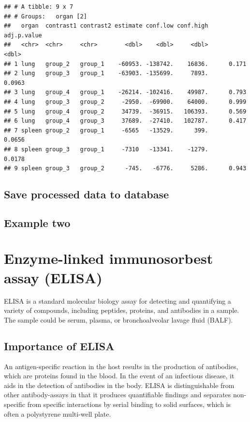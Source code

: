 \documentclass[
]{book}
\begin{document}
\begin{verbatim}
## # A tibble: 9 x 7
## # Groups:   organ [2]
##   organ  contrast1 contrast2 estimate conf.low conf.high adj.p.value
##   <chr>  <chr>     <chr>        <dbl>    <dbl>     <dbl>       <dbl>
## 1 lung   group_2   group_1    -60953. -138742.    16836.      0.171 
## 2 lung   group_3   group_1    -63903. -135699.     7893.      0.0963
## 3 lung   group_4   group_1    -26214. -102416.    49987.      0.793 
## 4 lung   group_3   group_2     -2950.  -69900.    64000.      0.999 
## 5 lung   group_4   group_2     34739.  -36915.   106393.      0.569 
## 6 lung   group_4   group_3     37689.  -27410.   102787.      0.417 
## 7 spleen group_2   group_1     -6565   -13529.      399.      0.0656
## 8 spleen group_3   group_1     -7310   -13341.    -1279.      0.0178
## 9 spleen group_3   group_2      -745.   -6776.     5286.      0.943
\end{verbatim}

\hypertarget{save-processed-data-to-database}{%
\section{Save processed data to database}\label{save-processed-data-to-database}}

\hypertarget{example-two}{%
\section{Example two}\label{example-two}}

\hypertarget{enzyme-linked-immunosorbest-assay-elisa}{%
\chapter{Enzyme-linked immunosorbest assay (ELISA)}\label{enzyme-linked-immunosorbest-assay-elisa}}

ELISA is a standard molecular biology assay for detecting and quantifying a
variety of compounds, including peptides, proteins, and antibodies in a sample.
The sample could be serum, plasma, or bronchoalveolar lavage fluid (BALF).

\hypertarget{importance-of-elisa}{%
\section{\texorpdfstring{\textbf{Importance of ELISA}}{Importance of ELISA}}\label{importance-of-elisa}}

An antigen-specific reaction in the host results in the production of antibodies, which are proteins found in the blood. In the event of an infectious disease,
it aids in the detection of antibodies in the body. ELISA is distinguishable from other antibody-assays in that it produces quantifiable findings and separates non-specific from specific interactions by serial binding to solid surfaces,
which is often a polystyrene multi-well plate.
\end{document}
